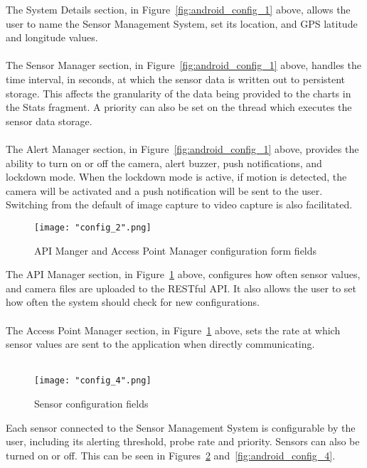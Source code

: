 \documentclass{article}
\begin{document}
\noindent
The System Details section, in Figure~\ref{fig:android_config_1} above,  allows the user to name the Sensor Management System, set its location, and GPS latitude and longitude values. \\\\
\noindent
The Sensor Manager section, in Figure~\ref{fig:android_config_1} above, handles the time interval, in seconds, at which the sensor data is written out to persistent storage. This affects the granularity of the data being provided to the charts in the Stats fragment.  A priority can also be set on the thread which executes the sensor data storage. \\\\
The Alert Manager section, in Figure~\ref{fig:android_config_1} above, provides the ability to turn on or off the camera, alert buzzer, push notifications, and lockdown mode. When the lockdown mode is active, if motion is detected, the camera will be activated and a push notification will be sent to the user. Switching from the default of image capture to video capture is also facilitated. 

\begin{figure}[H]
\centering
\texttt{[image: "config\_2".png]}
\caption{API Manger and Access Point Manager configuration form fields}
\label{fig:android_config_2}
\end{figure}

\noindent
The API Manager section, in Figure~\ref{fig:android_config_2} above, configures how often sensor values, and camera files are uploaded to the RESTful API. It also allows the user to set how often the system should check for new configurations.\\\\
The Access Point Manager section, in Figure~\ref{fig:android_config_2} above, sets the rate at which sensor values are sent to the application when directly communicating. \\\\

\begin{figure}[H]
\centering
\texttt{[image: "config\_4".png]}
\caption{Sensor configuration fields}
\label{fig:android_config_3}
\end{figure}

\noindent
Each sensor connected to the Sensor Management System is configurable by the user, including its alerting threshold, probe rate and priority. Sensors can also be turned on or off. This can be seen in Figures~\ref{fig:android_config_3} and~\ref{fig:android_config_4}.
\end{document}
